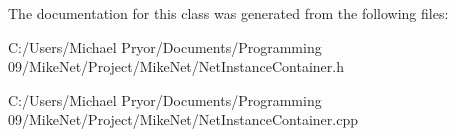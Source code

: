 The documentation for this class was generated from the following files:\begin{DoxyCompactItemize}
\item 
C:/Users/Michael Pryor/Documents/Programming 09/MikeNet/Project/MikeNet/NetInstanceContainer.h\item 
C:/Users/Michael Pryor/Documents/Programming 09/MikeNet/Project/MikeNet/NetInstanceContainer.cpp\end{DoxyCompactItemize}
